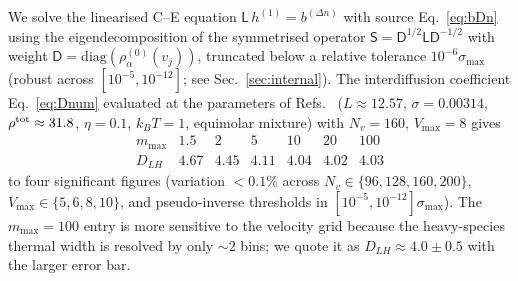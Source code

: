 \documentclass[aps,pre,twocolumn,superscriptaddress,longbibliography,floatfix]{revtex4-2}
\begin{document}
We solve the linearised C--E equation
$\mathsf{L}\,h^{(1)}=b^{(\Delta n)}$ with source
Eq.~\eqref{eq:bDn} using the eigendecomposition of the
symmetrised operator
$\mathsf{S}=\mathsf{D}^{1/2}\mathsf{L}\mathsf{D}^{-1/2}$
with weight $\mathsf{D}=\mathrm{diag}(\rho_\alpha^{(0)}(v_j))$,
truncated below a relative tolerance $10^{-6}\sigma_{\max}$
(robust across $[10^{-5},10^{-12}]$; see
Sec.~\ref{sec:internal}). The interdiffusion coefficient
Eq.~\eqref{eq:Dnum} evaluated at the parameters of
Refs.~\cite{PaperII,PaperIII}
($L\approx 12.57$, $\sigma=0.00314$, $\rho^{\rm tot}\approx 31.8$,
$\eta=0.1$, $k_BT=1$, equimolar mixture) with $N_v=160$,
$V_{\max}=8$ gives
\begin{equation}
\begin{array}{c|cccccc}
m_{\max} & 1.5 & 2 & 5 & 10 & 20 & 100 \\
\hline
D_{LH}   & 4.67 & 4.45 & 4.11 & 4.04 & 4.02 & 4.03
\end{array}
\label{eq:Dtab}
\end{equation}
to four significant figures (variation $<0.1\%$ across
$N_v\in\{96,128,160,200\}$, $V_{\max}\in\{5,6,8,10\}$, and
pseudo-inverse thresholds in
$[10^{-5},10^{-12}]\sigma_{\max}$). The $m_{\max}=100$
entry is more sensitive to the velocity grid because the
heavy-species thermal width is resolved by only $\sim 2$
bins; we quote it as $D_{LH}\approx 4.0\pm 0.5$ with the
larger error bar.
\end{document}
